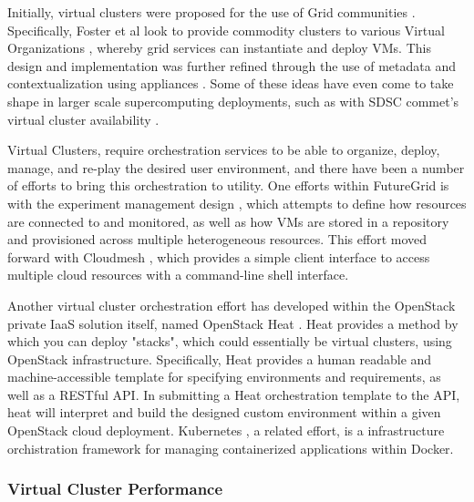 Initially, virtual clusters were proposed for the use of Grid communities \cite{Foster2006}. Specifically, Foster et al look to provide commodity clusters to various Virtual Organizations \cite{foster2001}, whereby grid services can instantiate and deploy VMs. This design and implementation was further refined through the use of metadata and contextualization using appliances \cite{keahey2008contextualization}. Some of these ideas have even come to take shape in larger scale supercomputing deployments, such as with SDSC commet's virtual cluster availability \cite{Moore2014}.

Virtual Clusters, require orchestration services to be able to organize, deploy, manage, and re-play the desired user environment, and there have been a number of efforts to bring this orchestration to utility. One efforts within FutureGrid is with the experiment management design \cite{las2010gce}, which attempts to define how resources are connected to and monitored, as well as how VMs are stored in a repository and provisioned across multiple heterogeneous resources. This effort moved forward with  Cloudmesh \cite{von2014cloudmesh}, which provides a simple client interface to access multiple cloud resources with a command-line shell interface. 

Another virtual cluster orchestration effort has developed within the OpenStack private IaaS solution itself, named OpenStack Heat \cite{www-openstack-heat}. Heat provides a method by which you can deploy "stacks", which could essentially be virtual clusters,  using OpenStack infrastructure. Specifically, Heat provides a human readable and machine-accessible template for specifying environments and requirements, as well as a RESTful API. In submitting a Heat orchestration template to the API, heat will interpret and build the designed custom environment within a given OpenStack cloud deployment. Kubernetes \cite{bernstein2014containers}, a related effort, is a infrastructure orchistration framework for managing containerized applications within Docker.  




\subsubsection{Virtual Cluster Performance}

